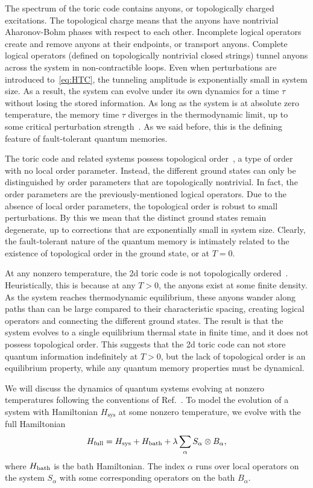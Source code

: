 The spectrum of the toric code contains anyons, or topologically charged excitations. The topological charge means that the anyons have nontrivial Aharonov-Bohm phases with respect to each other. Incomplete logical operators create and remove anyons at their endpoints, or  transport anyons. Complete logical operators (defined on topologically nontrivial closed strings) tunnel anyons across the system in non-contractible loops.  Even when perturbations are introduced to~\eqref{eq:HTC}, the tunneling amplitude is exponentially small in system size. As a result, the system can evolve under its own dynamics for a time $\tau$ without losing the stored information. As long as the system is at absolute zero temperature, the memory time $\tau$ diverges in the thermodynamic limit, up to some critical perturbation strength~\cite{Dennis2002Topological}. As we said before, this is the defining feature of fault-tolerant quantum memories.

The toric code and related systems possess topological order~\cite{Wen1990Topological}, a type of order with no local order parameter. Instead, the different ground states can only be distinguished by order parameters that are topologically nontrivial. In fact, the order parameters are the previously-mentioned logical operators. Due to the absence of local order parameters, the topological order is robust to small perturbations. By this we mean that the distinct ground states remain degenerate, up to corrections that are exponentially small in system size. Clearly, the fault-tolerant nature of the quantum memory is intimately related to the existence of topological order in the ground state, or at $T=0$.

At any nonzero temperature, the 2d toric code is not topologically ordered~\cite{Hastings2011Topological}. Heuristically, this is because at any $T>0$, the anyons exist at some finite density. As the system reaches thermodynamic equilibrium, these anyons wander along paths than can be large compared to their characteristic spacing, creating logical operators and connecting the different ground states. The result is that the system evolves to a single equilibrium thermal state in finite time, and it does not possess topological order. This suggests that the 2d toric code can not store quantum information indefinitely at $T>0$, but the lack of topological order is an equilibrium property, while any quantum memory properties must be dynamical. 

We will discuss the dynamics of quantum systems evolving at nonzero temperatures following the conventions of Ref.~\cite{RobertsBartlett2020}. To model the evolution of a system with Hamiltonian $H_\text{sys}$ at some nonzero temperature, we evolve with the full Hamiltonian
\begin{align}
H_\text{full} = H_{\text{sys}} + H_{\text{bath}} + \lambda \sum_\alpha S_\alpha \otimes B_\alpha, \label{eqn:bath}
\end{align}
where $H_{\text{bath}}$ is the bath Hamiltonian. The index $\alpha$ runs over local operators on the system $S_\alpha$ with some corresponding operators on the bath $B_\alpha$. 

